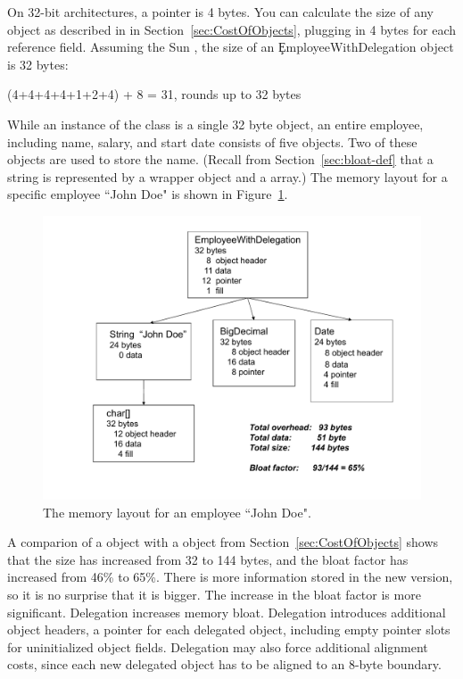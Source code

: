 On 32-bit architectures, a pointer is 4 bytes. You can
calculate the size of any object as described in in
Section~\ref{sec:CostOfObjects}, plugging in 4 bytes for each reference field. Assuming the Sun \jre,
the size of an \c{EmployeeWithDelegation} object is 32 bytes:
\begin{shortlisting}
(4+4+4+4+1+2+4) + 8 = 31, rounds up to 32 bytes
\end{shortlisting}

While an instance of the  class is a single 32
byte object, an entire employee, including name, salary, and start date
consists of five objects. Two of these objects are used to store the name.
(Recall from Section~\ref{sec:bloat-def} that a string is represented by a
wrapper  object and a  array.) The memory layout for
a specific employee ``John Doe" is shown in Figure~\ref{fig:employee-status}.
 \begin{figure}
  \centering
 \includegraphics[width=.80\textwidth]{part1/Figures/modelingdatatypes/employee-status.pdf}
  \caption{The memory layout for an employee ``John Doe".}
  \label{fig:employee-status}
\end{figure}

A comparion of a  object with a
 object from Section~\ref{sec:CostOfObjects} shows that
the size has increased from 32 to 144 bytes, and the bloat factor has increased from 46\% to 65\%. 
There is more information stored in the new version, so it is no surprise that it is bigger. The increase
in the bloat factor is more significant. Delegation increases memory bloat. Delegation introduces additional
object headers, a pointer for each delegated object, including empty
pointer slots for uninitialized object fields. Delegation may also force additional alignment costs, since
each new delegated object has to be aligned to an 8-byte boundary.


